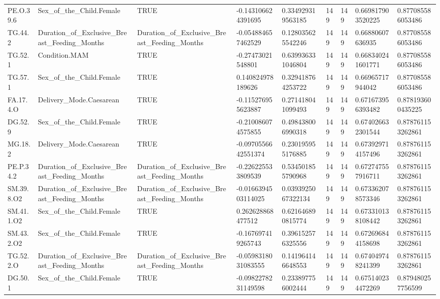 \begin{longtable}{lllllllll}
PE.O.39.6 & Sex\_of\_the\_Child.Female & TRUE & -0.143106624391695 & 0.334929319563185 & 149 & 149 & 0.669817903520225 & 0.877085586053486 \\
TG.44.2 & Duration\_of\_Exclusive\_Breast\_Feeding\_Months & Duration\_of\_Exclusive\_Breast\_Feeding\_Months & -0.054884657462529 & 0.128035625542246 & 149 & 149 & 0.66880607636935 & 0.877085586053486 \\
TG.52.1 & Condition.MAM & TRUE & -0.27473021548801 & 0.639936331046804 & 149 & 149 & 0.668340241601771 & 0.877085586053486 \\
TG.57.1 & Sex\_of\_the\_Child.Female & TRUE & 0.140824978189626 & 0.329418764253722 & 149 & 149 & 0.66965717944042 & 0.877085586053486 \\
FA.17.4.O & Delivery\_Mode.Caesarean & TRUE & -0.115276955623887 & 0.271418041099493 & 149 & 149 & 0.671673956393482 & 0.878193600435225 \\
DG.52.9 & Sex\_of\_the\_Child.Female & TRUE & -0.210086074575855 & 0.498438006990318 & 149 & 149 & 0.674026632301544 & 0.878761153262861 \\
MG.18.2 & Delivery\_Mode.Caesarean & TRUE & -0.0970556642551374 & 0.230195955176885 & 149 & 149 & 0.673929714157496 & 0.878761153262861 \\
PE.P.34.2 & Duration\_of\_Exclusive\_Breast\_Feeding\_Months & Duration\_of\_Exclusive\_Breast\_Feeding\_Months & -0.226225533809539 & 0.534501855790968 & 149 & 149 & 0.672747557916711 & 0.878761153262861 \\
SM.39.8.O2 & Duration\_of\_Exclusive\_Breast\_Feeding\_Months & Duration\_of\_Exclusive\_Breast\_Feeding\_Months & -0.0166394503114025 & 0.0393925067322134 & 149 & 149 & 0.673362078573346 & 0.878761153262861 \\
SM.41.1.O2 & Sex\_of\_the\_Child.Female & TRUE & 0.262628868477512 & 0.621646890815774 & 149 & 149 & 0.673310138108442 & 0.878761153262861 \\
SM.43.2.O2 & Sex\_of\_the\_Child.Female & TRUE & -0.167697419265743 & 0.396152576325556 & 149 & 149 & 0.672696844158698 & 0.878761153262861 \\
TG.52.2.O & Duration\_of\_Exclusive\_Breast\_Feeding\_Months & Duration\_of\_Exclusive\_Breast\_Feeding\_Months & -0.0598318031083555 & 0.141964146648553 & 149 & 149 & 0.674049748241399 & 0.878761153262861 \\
DG.50.1 & Sex\_of\_the\_Child.Female & TRUE & -0.0982278231149598 & 0.233897756002444 & 149 & 149 & 0.675140234472269 & 0.879480257756599 \\

\end{longtable}
